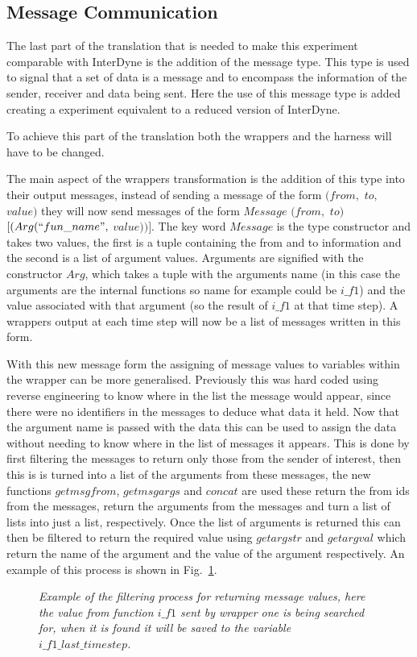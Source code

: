 \documentclass{article}
\begin{document}
\subsection{Message Communication}
The last part of the translation that is needed to make this experiment comparable with InterDyne is the addition of the message type. This type is used to signal that a set of data is a message and to encompass  the information of the sender, receiver and data being sent. Here the use of this message type is added creating a experiment equivalent to a reduced version of InterDyne.   

To achieve this part of the translation both the wrappers and the harness will have to be changed. 

The main aspect of the wrappers transformation is the addition of this type into their output messages, instead of sending a message of the form $(from,$ $to,$ $value)$ they will now send messages of the form  $Message$ $(from,$ $to)$ $[(Arg(``fun\_name",$ $value))]$. The key word $Message$ is the type constructor and takes two values, the first is a tuple containing the from and to information and the second is a list of argument values. Arguments are signified with the constructor $Arg$, which takes a tuple with the arguments name (in this case the arguments are the internal functions so  name for example could be $i\_f1$)  and the value associated with that argument (so the result of $i\_f1$ at that time step). A wrappers output at each time step will now be a list of messages written in this form. 

With this new message form the assigning of message values to variables within the wrapper can be more generalised. Previously this was hard coded using reverse engineering to know where in the list the message would appear, since there were no identifiers in the messages to deduce what data it held. Now that the argument name is passed with the data this can be used to assign the data without needing to know where in the list of messages it appears. This is done by first filtering the messages to return only those from the sender of interest, then this is is turned into a list of the arguments from these messages, the new functions $getmsgfrom$, $getmsgargs$ and $concat$ are used these return the from ids from the messages, return the arguments from the messages and turn a list of lists into just a list, respectively. Once the list of arguments is returned this can then be filtered to return the required value using $getargstr$ and $getargval$ which return the name of the argument and the value of the argument respectively. An example of this process is shown in Fig.~\ref{fig:filter8}. 
\begin{figure}[H]
	\centering
	
	\caption{\it Example of the filtering process for returning message values, here the value from function $i\_f1$ sent by wrapper one is being searched for, when it is found it will be saved to the variable $i\_f1\_last\_timestep$.}
	\label{fig:filter8}
\end{figure} 
\end{document}
